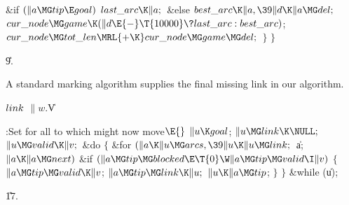 \&{if} ${}(\|a\MG\\{tip}\E\\{goal}){}$\1\5
${}\\{last\_arc}\K\|a;{}$\2\6
\&{else}\1\5
${}\\{best\_arc}\K\|a,\39\|d\K\|a\MG\\{del};{}$\2\2\2\6
${}\\{cur\_node}\MG\\{game}\K(\|d\E{-}\T{10000}\?\\{last\_arc}:\\{best%
\_arc}){}$;\6
${}\\{cur\_node}\MG\\{tot\_len}\MRL{+{\K}}\\{cur\_node}\MG\\{game}\MG%
\\{del};{}$\6
\4${}\}{}$\2\6
\4${}\}{}$\2\par
\U9.\fi

A standard marking algorithm supplies the final missing link in
our algorithm.

\Y\B\4\D$\\{link}$ \5
$\|w.{}$\|V\par
\Y\B\4:Set  for all  to which 
might now move\X${}\E{}$\6
$\|u\K\\{goal}{}$;\6
${}\|u\MG\\{link}\K\NULL;{}$\6
${}\|u\MG\\{valid}\K\|v;{}$\6
\&{do}\5
${}\{{}$\1\6
\&{for} ${}(\|a\K\|u\MG\\{arcs},\39\|u\K\|u\MG\\{link};{}$ \|a; ${}\|a\K\|a\MG%
\\{next}){}$\1\6
\&{if} ${}(\|a\MG\\{tip}\MG\\{blocked}\E\T{0}\W\|a\MG\\{tip}\MG\\{valid}\I%
\|v){}$\5
${}\{{}$\1\6
${}\|a\MG\\{tip}\MG\\{valid}\K\|v{}$;\6
${}\|a\MG\\{tip}\MG\\{link}\K\|u;{}$\6
${}\|u\K\|a\MG\\{tip}{}$;\6
\4${}\}{}$\2\2\6
\4${}\}{}$\5
\2\5
\&{while} (\|u);\par
\U17.\fi

